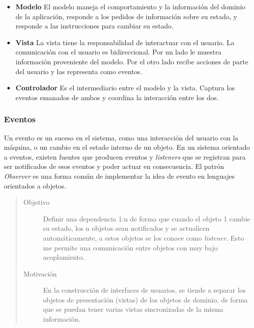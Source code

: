 	\begin {itemize}
		\item {\bf Modelo}
			El modelo maneja el comportamiento y la información del dominio de la
			aplicación, responde a los pedidos de información sobre su estado, 
			y responde a las instrucciones para cambiar su estado. 
			
			
		\item {\bf Vista}
			La vista tiene la responsabilidad de interactuar con el usuario. La
			comunicación con el usuario es bidireccional. Por un lado le muestra
			información proveniente del modelo. Por el otro lado recibe acciones de parte
			del usuario y las representa como eventos.
			
		\item {\bf Controlador}
			Es el intermediario entre el modelo y la vista.
			Captura los eventos emanados de ambos y coordina la interacción entre los
			dos.
	\end {itemize}

\subsubsection{Eventos}
\label{Eventos}

	Un evento es un suceso en el sistema, como una interacción del usuario con
	la máquina, o un cambio en el estado interno de un objeto.
	En un sistema orientado a eventos, existen fuentes que producen eventos y
	\emph{listeners} que se registran para ser notificados de esos eventos y poder
	actuar en consecuencia.	
	El patrón \emph{Observer} \cite{Gamma1995} es una forma común de implementar la
	idea de evento en lenguajes orientados a objetos.

	\begin{quote}
	
	\begin{description}
	   
	\item [Objetivo] Definir una dependencia 1:n de forma que cuando el objeto
		1 cambie su estado, los n objetos sean notificados y se actualicen
		automáticamente, a estos objetos se los conoce como \emph{listener}. Esto me
		permite una comunicación entre objetos con muy bajo acoplamiento.
	
	\item [Motivación] En la construcción de interfaces de usuarios, se tiende
		a separar los objetos de presentación (vistas) de los objetos de dominio, de
		forma que se puedan tener varias vistas sincronizadas de la misma información.
	
	\end{description}
	\end{quote}
	
